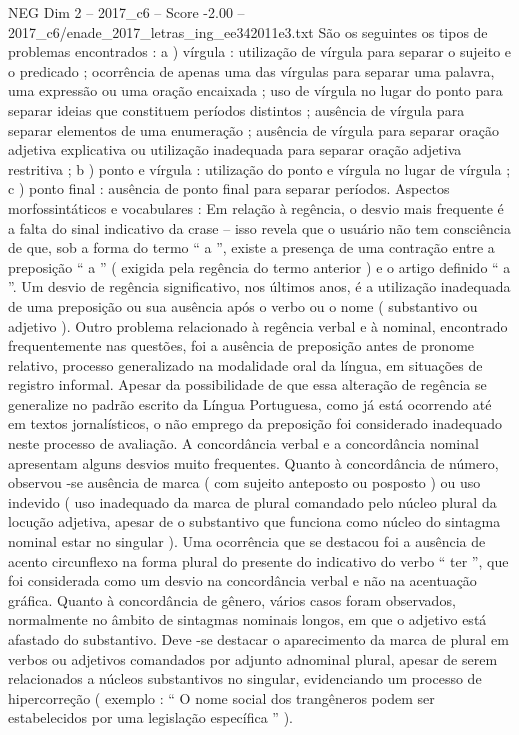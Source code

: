 \begin{textsample}{NEG Dim 2 – 2017\_c6 – Score -2.00 – 2017\_c6/enade\_2017\_letras\_ing\_ee342011e3.txt}
São os seguintes os tipos de problemas encontrados : a ) vírgula : utilização de vírgula para separar o sujeito e o predicado ; ocorrência de apenas uma das vírgulas para separar uma palavra, uma expressão ou uma oração encaixada ; uso de vírgula no lugar do ponto para separar ideias que constituem períodos distintos ; ausência de vírgula para separar elementos de uma enumeração ; ausência de vírgula para separar oração adjetiva explicativa ou utilização inadequada para separar oração adjetiva restritiva ; b ) ponto e vírgula : utilização do ponto e vírgula no lugar de vírgula ; c ) ponto final : ausência de ponto final para separar períodos.
Aspectos morfossintáticos e vocabulares : Em relação à regência, o desvio mais frequente é a falta do sinal indicativo da crase – isso revela que o usuário não tem consciência de que, sob a forma do termo “ a ”, existe a presença de uma contração entre a preposição “ a ” ( exigida pela regência do termo anterior ) e o artigo definido “ a ”.
Um desvio de regência significativo, nos últimos anos, é a utilização inadequada de uma preposição ou sua ausência após o verbo ou o nome ( substantivo ou adjetivo ).
Outro problema relacionado à regência verbal e à nominal, encontrado frequentemente nas questões, foi a ausência de preposição antes de pronome relativo, processo generalizado na modalidade oral da língua, em situações de registro informal.
Apesar da possibilidade de que essa alteração de regência se generalize no padrão escrito da Língua Portuguesa, como já está ocorrendo até em textos jornalísticos, o não emprego da preposição foi considerado inadequado neste processo de avaliação.
A concordância verbal e a concordância nominal apresentam alguns desvios muito frequentes.
Quanto à concordância de número, observou -se ausência de marca ( com sujeito anteposto ou posposto ) ou uso indevido ( uso inadequado da marca de plural comandado pelo núcleo plural da locução adjetiva, apesar de o substantivo que funciona como núcleo do sintagma nominal estar no singular ).
Uma ocorrência que se destacou foi a ausência de acento circunflexo na forma plural do presente do indicativo do verbo “ ter ”, que foi considerada como um desvio na concordância verbal e não na acentuação gráfica.
Quanto à concordância de gênero, vários casos foram observados, normalmente no âmbito de sintagmas nominais longos, em que o adjetivo está afastado do substantivo.
Deve -se destacar o aparecimento da marca de plural em verbos ou adjetivos comandados por adjunto adnominal plural, apesar de serem relacionados a núcleos substantivos no singular, evidenciando um processo de hipercorreção ( exemplo : “ O nome social dos trangêneros podem ser estabelecidos por uma legislação específica ” ).

\end{textsample}
